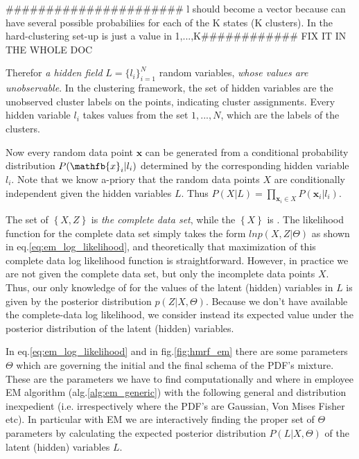 \documentclass[dvips,dvipdfm,pdftex]{llncs}
\begin{document}
###################### l should become a vector  because can have several possible probabiliies for each of the K states (K clusters). In the hard-clustering set-up is just a value in {1,...,K}############ FIX IT IN THE WHOLE DOC

Therefor \emph{a hidden field} $L=\{l_{i}\}_{i=1}^{N}$ random variables, \emph{whose values are unobservable}. In the clustering framework, the set of hidden variables are the unobserved cluster labels on the
points, indicating cluster assignments. Every hidden variable $l_{i}$ takes values from the set ${1, . . . , N}$, which are the labels of the clusters.

Now every random data point $\mathbf{x}$ can be generated from a conditional probability distribution $P(\mathfb{x}_{i}|l_{i})$ determined by the corresponding hidden variable $l_{i}$. Note that we know a-priory that the random data points $X$ are conditionally independent given the hidden variables $L$. Thus $P(X|L) = \prod_{\mathbf{x}_{i}\in X}P(\mathbf{x}_{i}|l_{i})$.

The set of $\left\{X,Z\right\}$ is \emph{the complete data set}, while the $\left\{X\right\}$ is . The likelihood function for the complete data set simply takes the form $lnp(X,Z|\Theta)$ as shown in eq.\ref{eq:em_log_likelihood}, and theoretically that maximization of this complete data log likelihood function is straightforward. However, in practice we are not given the complete data set, but only the incomplete data points $X$. Thus, our only knowledge of for the values of the latent (hidden) variables in $L$ is given by the posterior distribution $p(Z|X,\Theta)$. Because we don't have available the complete-data log likelihood, we consider instead its expected value under the posterior distribution of the latent (hidden) variables.

In eq.\ref{eq:em_log_likelihood} and in fig.\ref{fig:hmrf_em} there are some parameters $\Theta$ which are governing the initial and the final schema of the PDF's mixture. These are the parameters we have to find computationally and where in employee EM algorithm (alg.\ref{alg:em_generic}) with the following general and distribution inexpedient (i.e. irrespectively where the PDF's are Gaussian, Von Mises Fisher etc). In particular with EM we are interactively finding the proper set of $\Theta$ parameters by calculating the expected posterior distribution $P(L|X,\Theta)$ of the latent (hidden) variables $L$.
\end{document}
